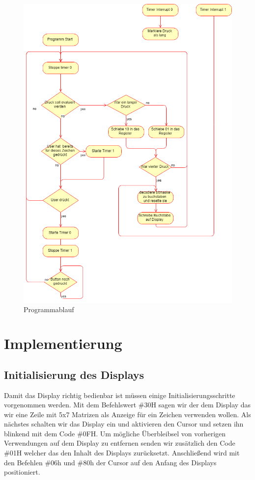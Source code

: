 \documentclass[a4paper,12pt]{article}
\begin{document}
	\begin{figure}
		\centering
		\includegraphics[width=0.8\linewidth]{Bilder/Programmablaufplan}
		\caption[Programmablauf]{Programmablauf}
		\label{fig:programmablaufplan}
	\end{figure}

	\newpage
	\section{Implementierung}
	\subsection{Initialisierung des Displays}
	 Damit das Display richtig bedienbar ist müssen einige Initialisierungsschritte vorgenommen werden. Mit dem Befehlswert \#30H sagen wir der dem Display das wir eine Zeile mit 5x7 Matrizen als Anzeige für ein Zeichen verwenden wollen. Als nächstes schalten wir das Display ein und aktivieren den Cursor und setzen ihn blinkend mit dem Code \#0FH. Um mögliche Überbleibsel von vorherigen Verwendungen auf dem Display zu entfernen senden wir zusätzlich den Code \#01H welcher das den Inhalt des Displays zurücksetzt. Anschließend wird mit den Befehlen \#06h und \#80h der Cursor auf den Anfang des Displays positioniert.
\end{document}
